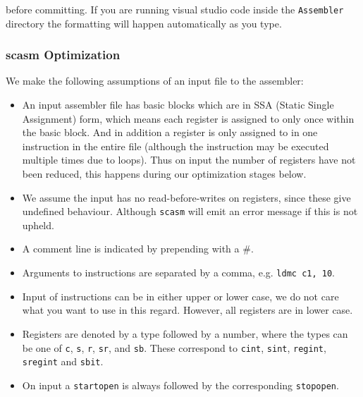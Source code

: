 
\noindent before committing. If you are running visual studio code inside the \verb+Assembler+ directory
the formatting will happen automatically as you type.

\subsubsection{scasm Optimization}
We make the following assumptions of an input file to the assembler:
\begin{itemize}
\item An input assembler file has basic blocks which are in SSA (Static Single Assignment) form, 
which means each register is assigned to only once within the basic block.
And in addition a register is only assigned to in one instruction in the entire
file (although the instruction may be executed multiple times due to loops).
Thus on input the number of registers have not been reduced, this
happens during our optimization stages below.

\item We assume the input has no read-before-writes on registers, since these give
undefined behaviour. Although \verb+scasm+ will emit an error message if this is not upheld.

\item A comment line is indicated by prepending with a $\#$.

\item Arguments to instructions are separated by a comma, e.g. \verb+ldmc c1, 10+.

\item Input of instructions can be in either upper or lower case, we do not care what you want to use in this
regard. However, all registers are in lower case.

\item Registers are denoted by a type followed by a number, where the types can be
one of \verb+c+, \verb+s+, \verb+r+, \verb+sr+, and \verb+sb+. These
correspond to \verb+cint+, \verb+sint+, \verb+regint+, \verb+sregint+ and
\verb+sbit+.

\item On input a \verb+startopen+ is always followed by the corresponding
\verb+stopopen+.
\end{itemize}

